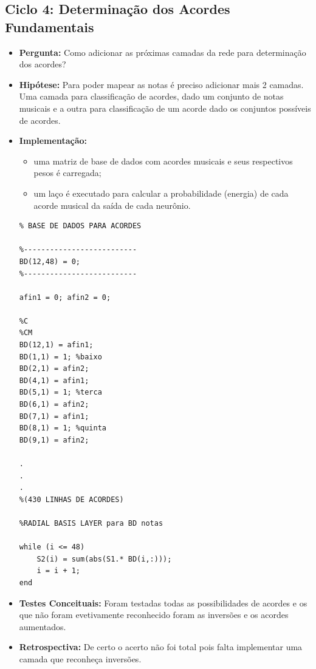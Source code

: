 \subsection{Ciclo 4: Determinação dos Acordes Fundamentais}
\label{subsec:ciclo_4}
\begin{itemize}
\item \textbf{Pergunta:} Como adicionar as próximas camadas da rede para determinação dos acordes?
\item \textbf{Hipótese:} Para poder mapear as notas é preciso adicionar mais 2 camadas. Uma camada para classificação de acordes, dado um conjunto de notas musicais e a outra para classificação de um acorde dado os conjuntos possíveis de acordes.
\item \textbf{Implementação:} 
\begin{itemize} 
	\item uma matriz de base de dados com acordes musicais e seus respectivos pesos é carregada;
	\item um laço é executado para calcular a probabilidade (energia) de cada acorde musical da saída de cada neurônio.
\end{itemize}
\begin{lstlisting}
% BASE DE DADOS PARA ACORDES

%--------------------------
BD(12,48) = 0;
%--------------------------

afin1 = 0; afin2 = 0;

%C
%CM
BD(12,1) = afin1;
BD(1,1) = 1; %baixo
BD(2,1) = afin2;
BD(4,1) = afin1;
BD(5,1) = 1; %terca
BD(6,1) = afin2;
BD(7,1) = afin1;
BD(8,1) = 1; %quinta
BD(9,1) = afin2;

.
.
.
%(430 LINHAS DE ACORDES)

%RADIAL BASIS LAYER para BD notas

while (i <= 48)
    S2(i) = sum(abs(S1.* BD(i,:)));
    i = i + 1;
end

\end{lstlisting}
\item \textbf{Testes Conceituais:} Foram testadas todas as possibilidades de acordes e os que não foram evetivamente reconhecido foram as inversões e os acordes aumentados.
\item \textbf{Retrospectiva:} De certo o acerto não foi total pois falta implementar uma camada que reconheça inversões.
\end{itemize}

